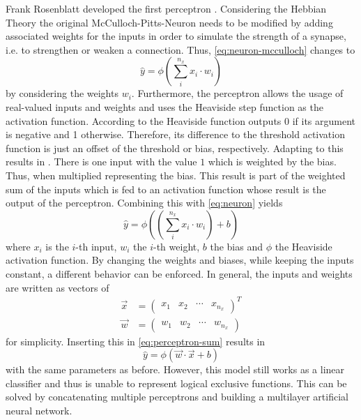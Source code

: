 Frank Rosenblatt developed the first perceptron \cite{Rosenblatt58}.
Considering the Hebbian Theory the original McCulloch-Pitts-Neuron needs to be modified by adding associated weights for the inputs in order to simulate the strength of a synapse, i.e. to strengthen or weaken a connection.
Thus, \eqref{eq:neuron-mcculloch} changes to
\begin{equation}
	\label{eq:neuron}
	\hat{y} = \phi \left( \sum_{i}^{n_x} x_i \cdot w_i \right)
\end{equation}
by considering the weights $w_i$.
Furthermore, the perceptron allows the usage of real-valued inputs and weights and uses the Heaviside step function as the activation function.
According to  the Heaviside function outputs 0 if its argument is negative and 1 otherwise.
Therefore, its difference to the threshold activation function is just an offset of the threshold or bias, respectively.
Adapting  to this results in .
There is one input with the value $1$ which is weighted by the bias.
Thus, when multiplied representing the bias.
This result is part of the weighted sum of the inputs which is fed to an activation function whose result is the output of the perceptron.
Combining this with \eqref{eq:neuron} yields
\begin{equation}
	\label{eq:perceptron-sum}
	 \hat{y} = \phi \left( \left( \sum_{i}^{n_x} x_i \cdot w_i \right) + b \right)
\end{equation}
where $x_i$ is the $i$-th input, $w_i$ the $i$-th weight, $b$ the bias and $\phi$ the Heaviside activation function.
By changing the weights and biases, while keeping the inputs constant, a different behavior can be enforced.
In general, the inputs and weights are written as vectors of
\begin{align}
	\vec{x} &= \begin{pmatrix} x_1 & x_2 & \cdots & x_{n_x} \end{pmatrix}^T \\
	\vec{w} &= \begin{pmatrix} w_1 & w_2 & \cdots & w_{n_x} \end{pmatrix} 
\end{align}
for simplicity.
Inserting this in \eqref{eq:perceptron-sum} results in
\begin{equation}
	\label{eq:perceptron-activation}
	\hat{y} = \phi \left( \vec{w} \cdot \vec{x} + b \right)
\end{equation}
with the same parameters as before.
However, this model still works as a linear classifier and thus is unable to represent logical exclusive functions.
This can be solved by concatenating multiple perceptrons and building a multilayer artificial neural network.